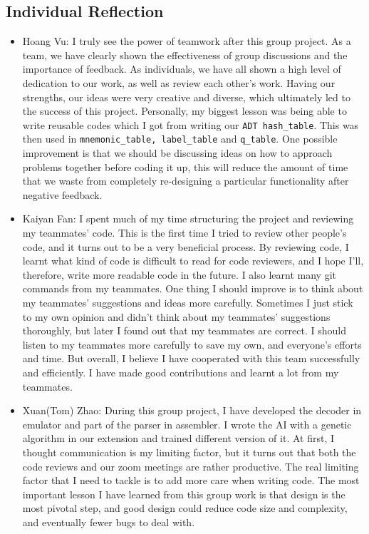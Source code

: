 \documentclass[11pt]{article}
\begin{document}
\subsection{Individual Reflection}
\begin{itemize}
    \item Hoang Vu: I truly see the power of teamwork after this group project. As a team, we have clearly shown the effectiveness of group discussions and the importance of feedback. As individuals, we have all shown a high level of dedication to our work, as well as review each other's work. Having our strengths, our ideas were very creative and diverse, which ultimately led to the success of this project.  Personally, my biggest lesson was being able to write reusable codes which I got from writing our \texttt{ADT hash\_table}. This was then used in \texttt{mnemonic\_table, label\_table} and \texttt{q\_table}. One possible improvement is that we should be discussing ideas on how to approach problems together before coding it up, this will reduce the amount of time that we waste from completely re-designing a particular functionality after negative feedback.    
    \item Kaiyan Fan: I spent much of my time structuring the project and reviewing my teammates' code. This is the first time I tried to review other people's code, and it turns out to be a very beneficial process. By reviewing code, I learnt what kind of code is difficult to read for code reviewers, and I hope I'll, therefore, write more readable code in the future. I also learnt many git commands from my teammates. One thing I should improve is to think about my teammates' suggestions and ideas more carefully. Sometimes I just stick to my own opinion and didn't think about my teammates' suggestions thoroughly, but later I found out that my teammates are correct. I should listen to my teammates more carefully to save my own, and everyone's efforts and time. But overall, I believe I have cooperated with this team successfully and efficiently. I have made good contributions and learnt a lot from my teammates.
    \item Xuan(Tom) Zhao: During this group project, I have developed the decoder in emulator and part of the parser in assembler. I wrote the AI with a genetic algorithm in our extension and trained different version of it. At first, I thought communication is my limiting factor, but it turns out that both the code reviews and our zoom meetings are rather productive. The real limiting factor that I need to tackle is to add more care when writing code. The most important lesson I have learned from this group work is that design is the most pivotal step, and good design could reduce code size and complexity, and eventually fewer bugs to deal with.

\end{itemize}
\end{document}
